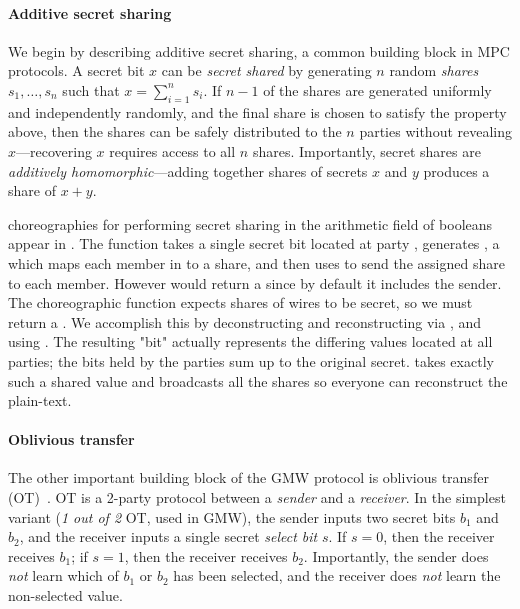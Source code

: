 \paragraph{Additive secret sharing}
We begin by describing additive secret sharing, a common building block in MPC protocols. A secret bit $x$ can be \emph{secret shared} by generating $n$ random \emph{shares} $s_1, \dots, s_n$ such that $x = \sum_{i=1}^n s_i$. If $n-1$ of the shares are generated uniformly and independently randomly, and the final share is chosen to satisfy the property above, then the shares can be safely distributed to the $n$ parties without revealing $x$---recovering $x$ requires access to all $n$ shares. Importantly, secret shares are \emph{additively homomorphic}---adding together shares of secrets $x$ and $y$ produces a share of $x+y$.

\MultiChor choreographies for performing secret sharing in the arithmetic field of booleans appear in
. The function  takes a single secret bit located at party , generates ,
a  which maps each member in  to a share,
and then uses  to send the assigned share to each member.
However  would return a  since by default it includes the sender.
The choreographic function  expects shares of wires to be secret,
so we must return a .
We accomplish this by deconstructing and reconstructing via ,
and using .
The resulting  "bit" actually represents the differing values located at all parties;
the bits held by the parties sum up to the original secret.
 takes exactly such a shared value and broadcasts
all the shares so everyone can reconstruct the plain-text.

\paragraph{Oblivious transfer}
The other important building block of the GMW protocol is oblivious transfer (OT)~\cite{naor2001efficient}.
OT is a 2-party protocol between a \emph{sender} and a \emph{receiver}.
In the simplest variant (\emph{1 out of 2} OT, used in GMW), the sender inputs two secret bits $b_1$ and $b_2$,
and the receiver inputs a single secret \emph{select bit} $s$.
If $s=0$, then the receiver receives $b_1$; if $s=1$, then the receiver receives $b_2$.
Importantly, the sender does \emph{not} learn which of $b_1$ or $b_2$ has been selected,
and the receiver does \emph{not} learn the non-selected value.

